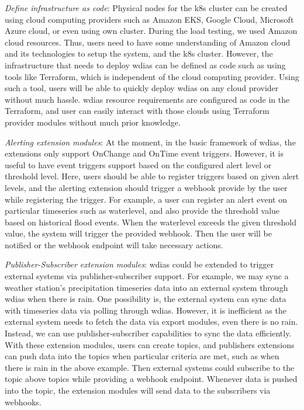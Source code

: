 \emph{Define infrastructure as code}:
Physical nodes for the \acrshort{k8s} cluster can be created using cloud computing providers such as Amazon EKS, Google Cloud, Microsoft Azure cloud, or even using own cluster. During the load testing, we used Amazon cloud resources. Thus, users need to have some understanding of Amazon cloud and its technologies to setup the system, and the \acrshort{k8s} cluster. However, the infrastructure that needs to deploy \acrshort{wdias} can be defined as code such as using tools like Terraform, which is independent of the cloud computing provider. Using such a tool, users will be able to quickly deploy \acrshort{wdias} on any cloud provider without much hassle. \acrshort{wdias} resource requirements are configured as code in the Terraform, and user can easily interact with those clouds using Terraform provider modules without much prior knowledge.

\emph{Alerting extension modules}: At the moment, in the basic framework of \acrshort{wdias}, the extensions only support OnChange and OnTime event triggers. However, it is useful to have event triggers support based on the configured alert level or threshold level. Here, users should be able to register triggers based on given alert levels, and the alerting extension should trigger a webhook provide by the user while registering the trigger. For example, a user can register an alert event on particular timeseries such as waterlevel, and also provide the threshold value based on historical flood events. When the waterlevel exceeds the given threshold value, the system will trigger the provided webhook. Then the user will be notified or the webhook endpoint will take necessary actions.

\emph{Publisher-Subscriber extension modules}: \acrshort{wdias} could be extended to trigger external systems via publisher-subscriber support. For example, we may sync a weather station's precipitation timeseries data into an external system through \acrshort{wdias} when there is rain. One possibility is, the external system can sync data with timeseries data via polling through \acrshort{wdias}. However, it is inefficient as the external system needs to fetch the data via export modules, even there is no rain. Instead, we can use publisher-subscriber capabilities to sync the data efficiently. With these extension modules, users can create topics, and publishers extensions can push data into the topics when particular criteria are met, such as when there is rain in the above example. Then external systems could subscribe to the topic above topics while providing a webhook endpoint. Whenever data is pushed into the topic, the extension modules will send data to the subscribers via webhooks.
